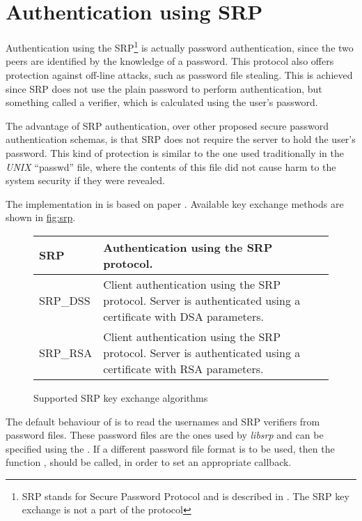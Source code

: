 \section{Authentication using SRP}
Authentication using the SRP\footnote{SRP stands for Secure Password Protocol and 
is described in \cite{RFC2945}. The SRP key exchange is not a part of the \tlsI{} protocol}
is actually password authentication, since the two peers are identified by the knowledge of a password. 
This protocol also offers protection against off-line attacks, such as password 
file stealing. 
This is achieved since SRP does not use the plain password to perform authentication, 
but something called a verifier, which is calculated using the user's password.
\par The advantage of SRP authentication, over other proposed secure password 
authentication schemas, is that SRP does not require the server to hold
the user's password. This kind of protection is similar to the one used traditionally
in the \emph{UNIX} ``passwd'' file, where the contents of this file did not cause
harm to the system security if they were revealed.
\par
The implementation in \gnutls{} is based on paper \cite{TLSSRP}.
Available key exchange methods are shown in \hyperref{figure}{figure }{}{fig:srp}.

\begin{figure}[hbtp]
\begin{tabular}{|l|p{9cm}|}

\hline
SRP & Authentication using the SRP protocol. 
\\
\hline
SRP\_DSS & Client authentication using the SRP protocol. Server is 
authenticated using a certificate with DSA parameters.
\\
\hline
SRP\_RSA & Client authentication using the SRP protocol. Server is 
authenticated using a certificate with RSA parameters.
\\
\hline
\end{tabular}

\caption{Supported SRP key exchange algorithms}
\label{fig:srp}

\end{figure}

The default behaviour of \gnutls{} is to read the usernames and
SRP verifiers from password files. These password files are the ones used
by \emph{libsrp} and can be specified using the
.
If a different password file format is to be used, then the 
function ,
should be called, in order to set an appropriate callback.

